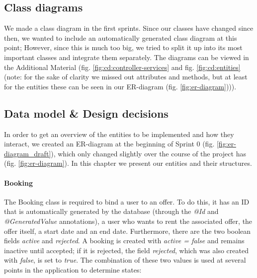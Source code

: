 \subsection{Class diagrams}
We made a class diagram in the first sprints. Since our classes have changed since then, we wanted to include an automatically generated class diagram at this point; However, since this is much too big, we tried to split it up into its most important classes and integrate them separately. The diagrams can be viewed in the Additional Material (fig. \ref{fig:cd:controller-services} and fig. \ref{fig:cd:entities} (note: for the sake of clarity we missed out attributes and methods, but at least for the entities these can be seen in our ER-diagram (fig. \ref{fig:er-diagram}))).

\subsection{Data model \& Design decisions}
In order to get an overview of the entities to be implemented and how they interact, we created an ER-diagram at the beginning of Sprint 0 (fig. \ref{fig:er-diagram_draft}), which only changed slightly over the course of the project has (fig. \ref{fig:er-diagram}). In this chapter we present our entities and their structures.

\paragraph{Booking}
The Booking class is required to bind a user to an offer. To do this, it has an ID that is automatically generated by the database (through the \textit{@Id} and \textit{@GeneratedValue} annotations), a user who wants to rent the associated offer, the offer itself, a start date and an end date. Furthermore, there are the two boolean fields \textit{active} and \textit{rejected}. A booking is created with \textit{active = false} and remains inactive until accepted; if it is rejected, the field \textit{rejected}, which was also created with \textit{false}, is set to \textit{true}. The combination of these two values is used at several points in the application to determine states:

